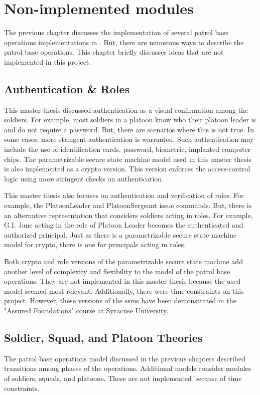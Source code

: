 \documentclass[../../main/main.tex]{subfiles}
\begin{document}
\chapter{Non-implemented modules}\label{chp:other}
The previous chapter discusses the implementation of several patrol base operations implementations in .  But, there are numerous ways to describe the patrol base operations.  This chapter briefly discusses ideas that are not implemented in this project.

\section{Authentication \& Roles}
This master thesis discussed authentication as a visual confirmation among the soldiers. For example, most soldiers in a platoon know who their platoon leader is and do not require a password.  But, there are scenarios where this is not true.   In some cases, more stringent authentication is warranted.  Such authentication may include the use of identification cards, password, biometric, implanted computer chips.  The parametrizable secure state machine model used in this master thesis is also implemented as a crypto version.  This version enforces the access-control logic using more stringent checks on authentication.  

This master thesis also focuses on authentication and verification of roles.  For example, the PlatoonLeader and PlatoonSergeant issue commands.  But, there is an alternative representation that considers soldiers acting in roles.  For example, G.I. Jane acting in the role of Platoon Leader becomes the authenticated and authorized principal.  Just as there is a parametrizable secure state machine model for crypto, there is one for principals acting in roles.  

Both crypto and role versions of the parametrizable secure state machine add another level of complexity and flexibility to the model of the patrol base operations.  They are not implemented in this master thesis because the used model seemed most relevant.  Additionally, there were time constraints on this project.  However, these versions of the ssms have been demonstrated in the "Assured Foundations" course at Syracuse University.  


\section{Soldier, Squad, and Platoon Theories}
The patrol base operations model discussed in the previous chapters described transitions among phases of the operations.  Additional models consider modules of soldiers, squads, and platoons.  These are not implemented because of time constraints.  
\end{document}
